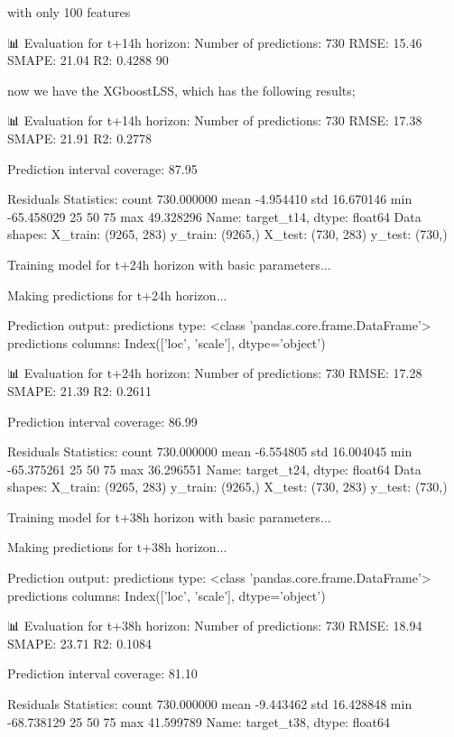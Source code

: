 with only 100 features

📊 Evaluation for t+14h horizon:
Number of predictions: 730
RMSE: 15.46
SMAPE: 21.04%
R2: 0.4288
90%


now we have the XGboostLSS, which has the following results;


📊 Evaluation for t+14h horizon:
Number of predictions: 730
RMSE: 17.38
SMAPE: 21.91%
R2: 0.2778

Prediction interval coverage: 87.95%

Residuals Statistics:
count    730.000000
mean      -4.954410
std       16.670146
min      -65.458029
25%
50%
75%
max       49.328296
Name: target_t14, dtype: float64
Data shapes:
X_train: (9265, 283)
y_train: (9265,)
X_test: (730, 283)
y_test: (730,)

Training model for t+24h horizon with basic parameters...

Making predictions for t+24h horizon...

Prediction output:
predictions type: <class 'pandas.core.frame.DataFrame'>
predictions columns: Index(['loc', 'scale'], dtype='object')

📊 Evaluation for t+24h horizon:
Number of predictions: 730
RMSE: 17.28
SMAPE: 21.39%
R2: 0.2611

Prediction interval coverage: 86.99%

Residuals Statistics:
count    730.000000
mean      -6.554805
std       16.004045
min      -65.375261
25%
50%
75%
max       36.296551
Name: target_t24, dtype: float64
Data shapes:
X_train: (9265, 283)
y_train: (9265,)
X_test: (730, 283)
y_test: (730,)

Training model for t+38h horizon with basic parameters...

Making predictions for t+38h horizon...

Prediction output:
predictions type: <class 'pandas.core.frame.DataFrame'>
predictions columns: Index(['loc', 'scale'], dtype='object')

📊 Evaluation for t+38h horizon:
Number of predictions: 730
RMSE: 18.94
SMAPE: 23.71%
R2: 0.1084

Prediction interval coverage: 81.10%

Residuals Statistics:
count    730.000000
mean      -9.443462
std       16.428848
min      -68.738129
25%
50%
75%
max       41.599789
Name: target_t38, dtype: float64


